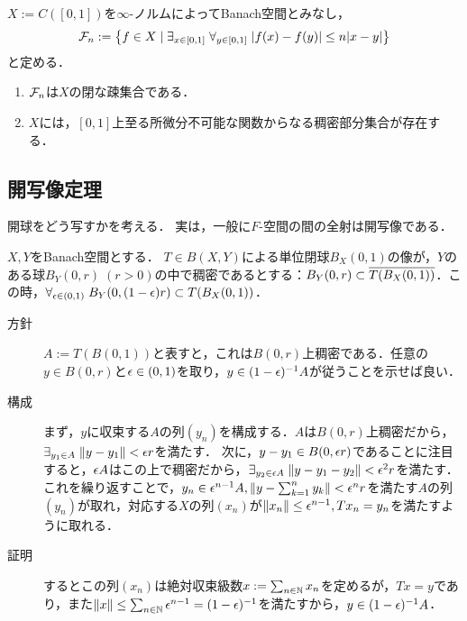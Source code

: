 \documentclass[uplatex,dvipdfmx]{jsreport}
\begin{document}
\begin{corollary}[至る所微分不可能な関数の存在]
    $X:=C([0,1])$を$\infty$-ノルムによってBanach空間とみなし，
    \[\mathcal{F}_n:=\left\{f\in X\mid\exists_{x\in[0,1]}\;\forall_{y\in[0,1]}\;\lvert f(x)-f(y)\rvert\le n\lvert x-y\rvert\right\}\]
    と定める．
    \begin{enumerate}
        \item $\mathcal{F}_n$は$X$の閉な疎集合である．
        \item $X$には，$[0,1]$上至る所微分不可能な関数からなる稠密部分集合が存在する．
    \end{enumerate}
\end{corollary}

\subsection{開写像定理}

\begin{tcolorbox}[colframe=ForestGreen, colback=ForestGreen!10!white,breakable,colbacktitle=ForestGreen!40!white,coltitle=black,fonttitle=\bfseries\sffamily,
title=]
    開球をどう写すかを考える．
    実は，一般に$F$-空間の間の全射は開写像である．
\end{tcolorbox}

\begin{lemma}[単位閉球の像で特異的な振る舞いをするのは境界部分のみである]\label{lemma-image-of-ball}
    $X,Y$をBanach空間とする．
    $T\in B(X,Y)$による単位閉球$B_X(0,1)$の像が，$Y$のある球$B_Y(0,r)\;(r>0)$の中で稠密であるとする：$B_Y(0,r)\subset\overline{T(B_X(0,1))}$．この時，$\forall_{\epsilon\in(0,1)}\; B_Y(0,(1-\epsilon)r)\subset T(B_X(0,1))$．
\end{lemma}
\begin{Proof}\mbox{}
    \begin{description}
        \item[方針] $A:=T(B(0,1))$と表すと，これは$B(0,r)$上稠密である．任意の$y\in B(0,r)$と$\epsilon\in(0,1)$を取り，$y\in(1-\epsilon)^{-1}A$が従うことを示せば良い．
        \item[構成] まず，$y$に収束する$A$の列$(y_n)$を構成する．$A$は$B(0,r)$上稠密だから，$\exists_{y_1\in A}\;\|y-y_1\|<\epsilon r$を満たす．
        次に，$y-y_1\in B(0,\epsilon r)$であることに注目すると，$\epsilon A$はこの上で稠密だから，$\exists_{y_2\in\epsilon A}\;\|y-y_1-y_2\|<\epsilon^2r$を満たす．
        これを繰り返すことで，$y_n\in\epsilon^{n-1}A,\left\|y-\sum^n_{k=1}y_k\right\|<\epsilon^nr$を満たす$A$の列$(y_n)$が取れ，対応する$X$の列$(x_n)$が$\|x_n\|\le\epsilon^{n-1},Tx_n=y_n$を満たすように取れる．
        \item[証明] するとこの列$(x_n)$は絶対収束級数$x:=\sum_{n\in\mathbb{N}}x_n$を定めるが，$Tx=y$であり，また$\|x\|\le\sum_{n\in\mathbb{N}}\epsilon^{n-1}=(1-\epsilon)^{-1}$を満たすから，$y\in(1-\epsilon)^{-1}A$．
    \end{description}
\end{Proof}
\end{document}
